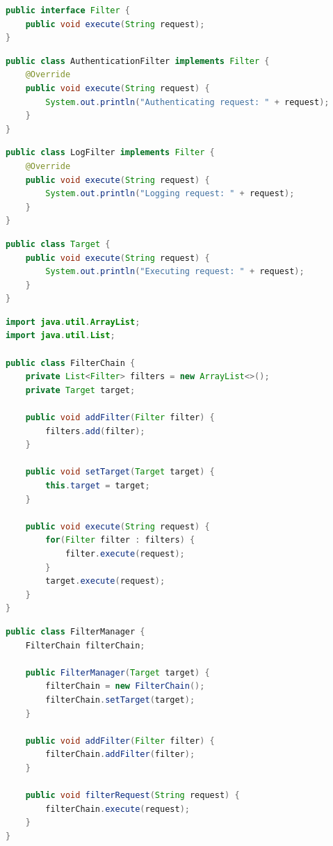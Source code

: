 \vspace{0.5cm}

\begin{lstlisting}[language=Java, title=Filter.java]
public interface Filter {
	public void execute(String request);
}
\end{lstlisting}

\begin{lstlisting}[language=Java, title=AuthenticationFilter.java]
public class AuthenticationFilter implements Filter {
	@Override
	public void execute(String request) {
		System.out.println("Authenticating request: " + request);
	}
}
\end{lstlisting}

\begin{lstlisting}[language=Java, title=LogFilter.java]
public class LogFilter implements Filter {
	@Override
	public void execute(String request) {
		System.out.println("Logging request: " + request);
	}
}
\end{lstlisting}

\begin{lstlisting}[language=Java, title=Target.java]
public class Target {
	public void execute(String request) {
		System.out.println("Executing request: " + request);
	}
}
\end{lstlisting}

\begin{lstlisting}[language=Java, title=FilterChain.java]
import java.util.ArrayList;
import java.util.List;

public class FilterChain {
	private List<Filter> filters = new ArrayList<>();
	private Target target;

	public void addFilter(Filter filter) {
		filters.add(filter);
	}

	public void setTarget(Target target) {
		this.target = target;
	}

	public void execute(String request) {
		for(Filter filter : filters) {
			filter.execute(request);
		}
		target.execute(request);
	}
}
\end{lstlisting}

\begin{lstlisting}[language=Java, title=FilterManager.java]
public class FilterManager {
	FilterChain filterChain;

	public FilterManager(Target target) {
		filterChain = new FilterChain();
		filterChain.setTarget(target);
	}

	public void addFilter(Filter filter) {
		filterChain.addFilter(filter);
	}

	public void filterRequest(String request) {
		filterChain.execute(request);
	}
}
\end{lstlisting}

